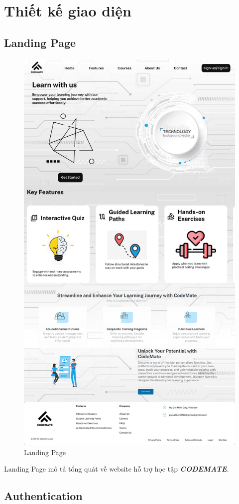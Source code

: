 \section{Thiết kế giao diện}
\subsection{Landing Page}
\begin{figure}[H]
    \centering
    \includegraphics[width=0.7\linewidth]{Images/figmaDesign/Landing Page.png}
    \caption{Landing Page}
    \label{fig:enter-label}
\end{figure}
Landing Page mô tả tổng quát về website hỗ trợ học tập \textbf{\textit{CODEMATE}}.
\subsection{Authentication}
